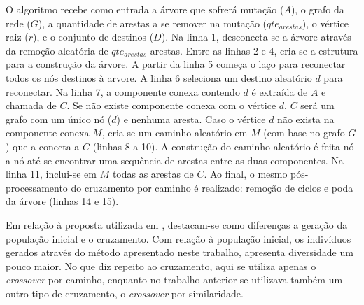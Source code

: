 O algoritmo recebe como entrada a árvore que sofrerá mutação ($A$), o grafo da rede ($G$), a quantidade de arestas a se remover na mutação ($qte_{arestas}$), o vértice raiz ($r$), e o conjunto de destinos ($D$). Na linha 1, desconecta-se a árvore através da remoção aleatória de $qte_{arestas}$ arestas. Entre as linhas 2 e 4, cria-se a estrutura para a construção da árvore. A partir da linha 5 começa o laço para reconectar todos os nós destinos à arvore. A linha 6 seleciona um destino aleatório $d$ para reconectar. Na linha 7, a componente conexa contendo $d$ é extraída de $A$ e chamada de $C$. Se não existe componente conexa com o vértice $d$, $C$ será um grafo com um único nó ($d$) e nenhuma aresta. Caso o vértice $d$ não exista na componente conexa $M$, cria-se um caminho aleatório em $M$ (com base no grafo $G$) que a conecta a $C$ (linhas 8 a 10). A construção do caminho aleatório é feita nó a nó até se encontrar uma sequência de arestas entre as duas componentes. Na linha 11, inclui-se em $M$ todas as arestas de $C$. Ao final, o mesmo pós-processamento do cruzamento por caminho é realizado: remoção de ciclos e poda da árvore (linhas 14 e 15).

Em relação à proposta utilizada em \cite{LafetaThesis}, destacam-se como diferenças a geração da população inicial e o cruzamento. Com relação à população inicial, os indivíduos gerados através do método apresentado neste trabalho, apresenta diversidade um pouco maior. No que diz repeito ao cruzamento, aqui se utiliza apenas o \textit{crossover} por caminho, enquanto no trabalho anterior se utilizava também um outro tipo de cruzamento, o \textit{crossover} por similaridade.